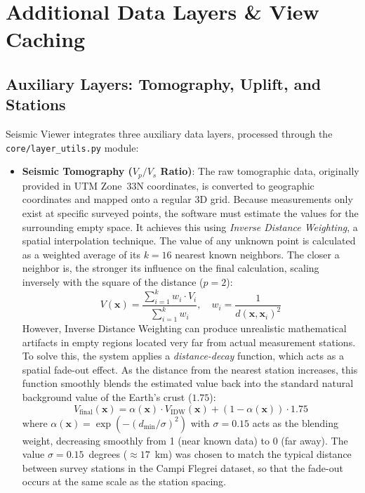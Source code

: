\section{Additional Data Layers \& View Caching}
\label{sec:additional-layers}

\subsection{Auxiliary Layers: Tomography, Uplift, and Stations}
\label{sec:tomography}
\label{sec:uplift}
\label{sec:stations}

Seismic Viewer integrates three auxiliary data layers, processed through the \texttt{core/\allowbreak layer\_utils.py} module:
\begin{itemize}
    \item \textbf{Seismic Tomography ($V_p/V_s$ Ratio)}: The raw tomographic data, originally provided in UTM Zone~33N coordinates, is converted to geographic coordinates and mapped onto a regular 3D grid. Because measurements only exist at specific surveyed points, the software must estimate the values for the surrounding empty space. It achieves this using \textit{Inverse Distance Weighting}, a spatial interpolation technique. The value of any unknown point is calculated as a weighted average of its $k=16$ nearest known neighbors. The closer a neighbor is, the stronger its influence on the final calculation, scaling inversely with the square of the distance ($p=2$):
    \begin{equation}
        V(\mathbf{x}) = \frac{\sum_{i=1}^{k} w_i \cdot V_i}{\sum_{i=1}^{k} w_i}, \quad w_i = \frac{1}{d(\mathbf{x}, \mathbf{x}_i)^2}
        \label{eq:idw}
    \end{equation}
    However, Inverse Distance Weighting can produce unrealistic mathematical artifacts in empty regions located very far from actual measurement stations. To solve this, the system applies a \textit{distance-decay} function, which acts as a spatial fade-out effect. As the distance from the nearest station increases, this function smoothly blends the estimated value back into the standard natural background value of the Earth's crust ($1.75$):
    \begin{equation}
        V_\text{final}(\mathbf{x}) = \alpha(\mathbf{x}) \cdot V_\text{IDW}(\mathbf{x}) + (1 - \alpha(\mathbf{x})) \cdot 1.75
        \label{eq:gaussian-damping}
    \end{equation}
    where $\alpha(\mathbf{x}) = \exp(-(d_\text{min}/\sigma)^2)$ with $\sigma = 0.15$ acts as the blending weight, decreasing smoothly from 1 (near known data) to 0 (far away). The value $\sigma = 0.15$~degrees (${\approx}17$~km) was chosen to match the typical distance between survey stations in the Campi Flegrei dataset, so that the fade-out occurs at the same scale as the station spacing.

\end{itemize}
